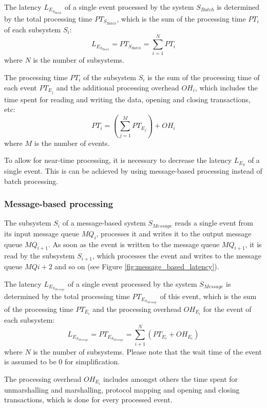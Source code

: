 The latency $L_{E_{S_{Batch}}}$ of a single event processed by the system $S_{Batch}$ is determined by the total processing time $PT_{S_{Batch}}$, which is the sum of the processing time $PT_i$ of each subsystem $S_i$:
\begin{displaymath}
L_{E_{S_{Batch}}} = PT_{S_{Batch}} = \sum_{i=1}^N PT_i
\end{displaymath}
where $N$ is the number of subsystems.

The processing time $PT_i$ of the subsystem $S_i$ is the sum of the processing time of each event $PT_{E_{j}}$ and the additional processing overhead $OH_i$, which includes the time spent for reading and writing the data, opening and closing transactions, etc:
\begin{displaymath}
PT_i = \left(\sum_{j=1}^M PT_{E_{j}}\right) + OH_i
\end{displaymath}
where $M$ is the number of events.

To allow for near-time processing, it is necessary to decrease the latency $L_{E_S}$ of a single event. This is can be achieved by using message-based processing instead of batch processing.

\subsubsection{Message-based processing}
The subsystem $S_i$ of a message-based system $S_{Message}$ reads a single event from its input message queue $MQ_i$, processes it and writes it to the output message queue $MQ_{i+1}$. As soon as the event is written to the message queue $MQ_{i+1}$, it is read by the subsystem $S_{i+1}$, which processes the event and writes to the message queue $MQ{i+2}$ and so on (see Figure \ref{fig:message_based_latency}).

The latency $L_{E_{S_{Message}}}$ of a single event processed by the system $S_{Message}$ is determined by the total processing time $PT_{E_{S_{Message}}}$ of this event, which is the sum of the processing time $PT_{E_i}$ and the processing overhead $OH_{E_{i}}$ for the event of each subsystem:
\begin{displaymath}
L_{E_{S_{Message}}} = PT_{E_{S_{Message}}} = \sum_{i+1}^N (PT_{E_i} + OH_{E_i})	
\end{displaymath}
where $N$ is the number of subsystems. Please note that the wait time of the event is assumed to be 0 for simplification.

The processing overhead $OH_{E_i}$ includes amongst others the time spent for unmarshalling and marshalling, protocol mapping and opening and closing transactions, which is done for every processed event.

